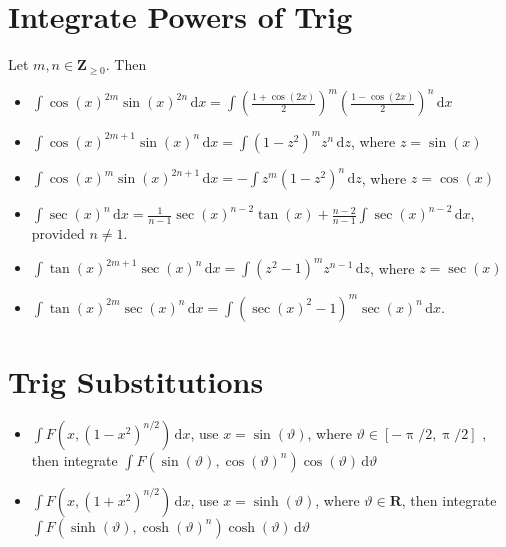 \documentclass[letterpaper,landscape,9pt,fleqn]{extarticle}
\newcommand{\reals}{\mathbf{R}}
\newcommand{\integers}{\mathbf{Z}}
\begin{document}
\begin{multicols*}{2}
\section*{Integrate Powers of Trig}
\vspace{0.1in}
Let $m,n \in \integers_{\geq 0}$. Then

\begin{itemize}[noitemsep]
  \item $\int \cos(x)^{2m} \sin(x)^{2n} \, \mathrm{d}x
         = \int \left(\frac{1+\cos(2 x)}{2}\right)^m 
                 \left(\frac{1-\cos(2 x)}{2}\right)^n 
                 \, \mathrm{d}x$

  \item $\int \cos(x)^{2m+1} \sin(x)^{n} \, \mathrm{d}x
  = \int (1-z^2)^m  z^{n}
             \, \mathrm{d}z$,  where $z = \sin(x)$

  \item $\int \cos(x)^{m} \sin(x)^{2n+1} \, \mathrm{d}x
             = -\int z^m (1-z^2)^n \, \mathrm{d}z$,  
             where $z = \cos(x)$

\item $\int \sec(x)^n \, \mathrm{d} x = \frac{1}{n-1} \sec(x)^{n-2} \tan(x) + \frac{n-2}{n-1} \int \sec(x)^{n-2} \, \mathrm{d} x$,
provided $n \neq 1$.
\item $\int \tan(x)^{2m+1} \sec(x)^n \, \mathrm{d} x =  \int (z^2-1)^m z^{n-1} \, \mathrm{d} z$,
where $z=\sec(x)$

\item $\int \tan(x)^{2m} \sec(x)^n \, \mathrm{d} x  = \int (\sec(x)^2-1)^m \sec(x)^n \, \mathrm{d} x$.


\end{itemize}
              \vspace{0.050in}
\section*{Trig Substitutions}
\vspace{0.25in}
\begin{itemize}[noitemsep]
\item $\int F \left(x, \left(1-x^2\right)^{n/2}\right) \, \mathrm{d} x$, 
use $x = \sin(\vartheta)$, where  $\vartheta \in [-\uppi/2, \uppi/2]$
, then integrate $\int F \left(\sin(\vartheta),\cos(\vartheta)^n\right) \cos(\vartheta) \, \mathrm{d} \vartheta$
\item  $\int F\left(x, \left (1+x^2 \right)^{n/2}\right) \, 
\mathrm{d} x$, use $x = \sinh(\vartheta)$,
where $\vartheta \in \reals$, then integrate
$\int F\left(\sinh(\vartheta), \cosh(\vartheta)^n \right)  \cosh(\vartheta)\, \mathrm{d} \vartheta$


\end{itemize}
\end{multicols*}
\end{document}
